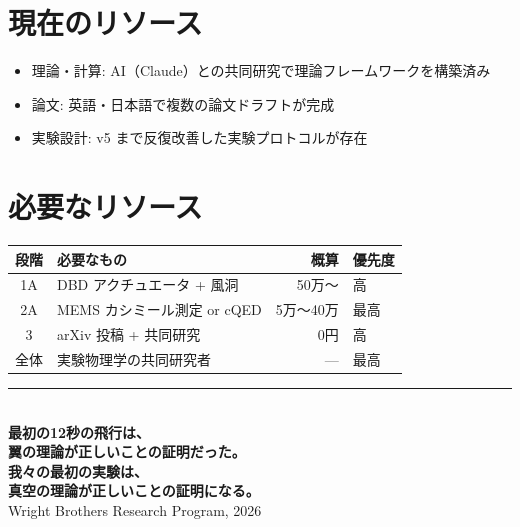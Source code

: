 \documentclass[11pt,a4paper]{article}
\begin{document}
\section{現在のリソース}

\begin{itemize}
\item 理論・計算: AI（Claude）との共同研究で理論フレームワークを構築済み
\item 論文: 英語・日本語で複数の論文ドラフトが完成
\item 実験設計: v5 まで反復改善した実験プロトコルが存在
\end{itemize}

\section{必要なリソース}

\begin{center}
\renewcommand{\arraystretch}{1.3}
\begin{tabular}{clrl}
\toprule
段階 & 必要なもの & 概算 & 優先度 \\
\midrule
1A & DBD アクチュエータ + 風洞 & 50万〜 & 高 \\
2A & MEMS カシミール測定 or cQED & 5万〜40万 & 最高 \\
3 & arXiv 投稿 + 共同研究 & 0円 & 高 \\
全体 & 実験物理学の共同研究者 & — & 最高 \\
\bottomrule
\end{tabular}
\end{center}

\vfill

\begin{center}
\rule{12cm}{0.4pt}\\[1cm]
{\fontsize{18pt}{22pt}\selectfont\bfseries
最初の12秒の飛行は、}\\[0.3cm]
{\fontsize{18pt}{22pt}\selectfont\bfseries
翼の理論が正しいことの証明だった。}\\[0.3cm]
{\fontsize{18pt}{22pt}\selectfont\bfseries
我々の最初の実験は、}\\[0.3cm]
{\fontsize{18pt}{22pt}\selectfont\bfseries
真空の理論が正しいことの証明になる。}\\[1cm]
{\large Wright Brothers Research Program, 2026}
\end{center}
\end{document}
